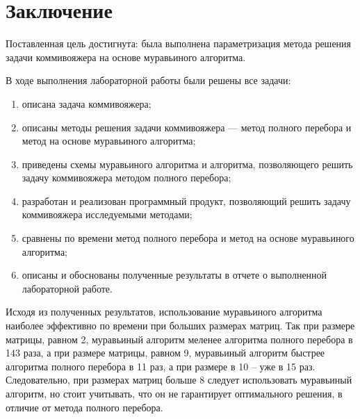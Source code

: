 \chapter*{Заключение}

Поставленная цель достигнута: была выполнена параметризация метода решения задачи коммивояжера на основе муравьиного алгоритма.

В ходе выполнения лабораторной работы были решены все задачи:

\begin{enumerate}
	\item описана задача коммивояжера;
	\item описаны методы решения задачи коммивояжера --- метод полного перебора и метод на основе муравьиного алгоритма;
	\item приведены схемы муравьиного алгоритма и алгоритма, позволяющего решить задачу коммивояжера методом полного перебора;
	\item разработан и реализован программный продукт, позволяющий решить задачу коммивояжера исследуемыми методами;
	\item сравнены по времени метод полного перебора и метод на основе муравьиного алгоритма;
	\item описаны и обоснованы полученные результаты в отчете о выполненной лабораторной работе.
\end{enumerate}

Исходя из полученных результатов, использование муравьиного алгоритма наиболее эффективно по времени при больших размерах матриц.
Так при размере матрицы, равном 2, муравьиный алгоритм меленее алгоритма полного перебора в 143 раза, а при размере матрицы, равном 9, муравьиный алгоритм быстрее алгоритма полного перебора в 11 раз, а при размере в 10 -- уже в 15 раз.
Следовательно, при размерах матриц больше 8 следует использовать муравьиный алгоритм, но стоит учитывать, что он не гарантирует оптимального решения, в отличие от метода полного перебора.
